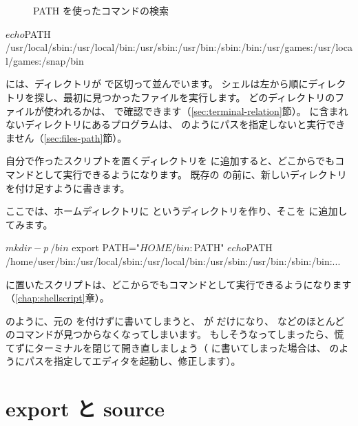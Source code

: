 \begin{figure}[tb]
  \centering
  
  \caption{PATH を使ったコマンドの検索}
  \label{fig:env-path}
\end{figure}

\begin{terminal}
$ echo $PATH
/usr/local/sbin:/usr/local/bin:/usr/sbin:/usr/bin:/sbin:/bin:/usr/games:/usr/local/games:/snap/bin
\end{terminal}

 には、ディレクトリが \cmd{:} で区切って並んでいます。
シェルは左から順にディレクトリを探し、最初に見つかったファイルを実行します。
どのディレクトリのファイルが使われるかは、 で確認できます（\ref{sec:terminal-relation}節）。
 に含まれないディレクトリにあるプログラムは、 のようにパスを指定しないと実行できません（\ref{sec:files-path}節）。

自分で作ったスクリプトを置くディレクトリを  に追加すると、どこからでもコマンドとして実行できるようになります。
既存の  の前に、新しいディレクトリを付け足すように書きます。

ここでは、ホームディレクトリに  というディレクトリを作り、そこを  に追加してみます。

\begin{terminal}
$ mkdir -p ~/bin
$ export PATH="$HOME/bin:$PATH"
$ echo $PATH
/home/user/bin:/usr/local/sbin:/usr/local/bin:/usr/sbin:/usr/bin:/sbin:/bin:...
\end{terminal}

 に置いたスクリプトは、どこからでもコマンドとして実行できるようになります（\ref{chap:shellscript}章）。

\begin{caution}
   のように、元の  を付けずに書いてしまうと、 が  だけになり、 などのほとんどのコマンドが見つからなくなってしまいます。
  もしそうなってしまったら、慌てずにターミナルを閉じて開き直しましょう（ に書いてしまった場合は、 のようにパスを指定してエディタを起動し、修正します）。
\end{caution}

\section{export と source}
\label{sec:env-export-source}

